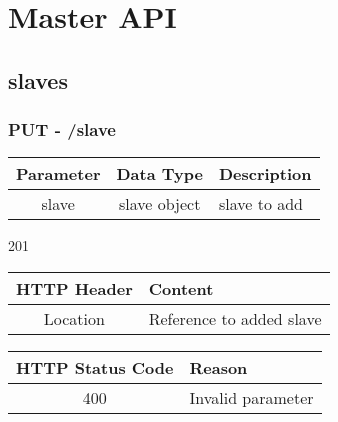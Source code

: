 \newcommand{\apicall}[7][]{
	\subsubsection{\uppercase{#1} - #2}
	\begin{description}[leftmargin=!,labelwidth=\widthof{\bfseries Return Codesaa}] %
		\item[Parameters]
		\begin{tabularx}{\linewidth}{c|c|*1{>{\centering\arraybackslash}X}@{}}
			\textbf{Parameter} & \textbf{Data Type} & \textbf{Description}\\
			\hline
			#3
		\end{tabularx}
		
		\item[Returns]
		\begin{description}[leftmargin=!,labelwidth=\widthof{\bfseries Status Codeaa}] %
			\item[Status Code] #4
			\item[Headers] \begin{tabularx}{\linewidth}{c|*1{>{\centering\arraybackslash}X}@{}}
				\textbf{HTTP Header} & \textbf{Content}\\
				\hline
				#5
			\end{tabularx}
			\item[Body] #6
		\end{description}
		
		\item[Error Codes]
		\begin{tabularx}{\linewidth}{c|*1{>{\centering\arraybackslash}X}@{}}
			\textbf{HTTP Status Code} & \textbf{Reason}\\
			\hline
			#7
		\end{tabularx}
	\end{description}
}

\section{Master API}
\subsection{slaves}
\apicall[put]{/slave}
	{slave & slave object & slave to add}
	{201}
	{Location & Reference to added slave}
	{}
	{400 & Invalid parameter}